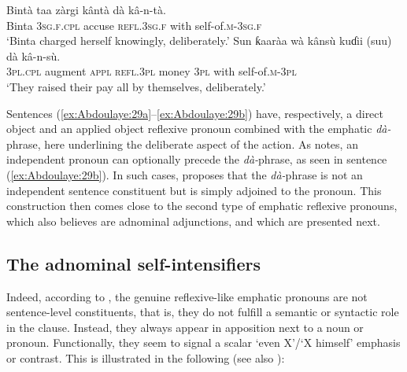 \documentclass[output=paper]{langscibook}
\begin{document}
\ea%
    \label{ex:Abdoulaye:29}
    \ea \label{ex:Abdoulaye:29a}
    \gll Bintà  taa  zàrgi  kântà  dà  kâ-n-tà.\\
    Binta  \textsc{3sg.f.cpl}  accuse  \textsc{refl.3sg.f}  with  self-of.\textsc{m-3sg.f}\\
    \glt `Binta charged herself knowingly, deliberately.’
    \ex \label{ex:Abdoulaye:29b}
    \gll Sun  ƙaaràa  wà  kânsù  kuɗii  (suu)  dà  kâ-n-sù.\\
    \textsc{3pl.cpl}  augment  \textsc{appl}  \textsc{refl.3pl}  money  \textsc{3pl}  with  self-of.\textsc{m-3pl}\\
    \glt `They raised their pay all by themselves, deliberately.’
    \z
\z

       

Sentences (\ref{ex:Abdoulaye:29a}--\ref{ex:Abdoulaye:29b}) have, respectively, a direct object and an applied object reflexive pronoun combined with the emphatic \textit{dà\nobreakdash-}phrase, here underlining the deliberate aspect of the action. As \citet[527]{Newman2000} notes, an independent pronoun can optionally precede the \textit{dà\nobreakdash-}phrase, as seen in sentence (\ref{ex:Abdoulaye:29b}). In such cases, \citeauthor{Newman2000} proposes that the \textit{dà\nobreakdash-}phrase is not an independent sentence constituent but is simply adjoined to the pronoun. This construction then comes close to the second type of emphatic reflexive pronouns, which \citeauthor{Newman2000} also believes are adnominal adjunctions, and which are presented next.


\subsection{The adnominal self-intensifiers} \label{sec:Abdoulaye:6.2}

Indeed, according to \citet{Newman2000}, the genuine reflexive-like emphatic pronouns are not sentence-level constituents, that is, they do not fulfill a semantic or syntactic role in the clause. Instead, they always appear in apposition next to a noun or pronoun. Functionally, they seem to signal a scalar ‘even X’/‘X himself’ emphasis or contrast. This is illustrated in the following (see also \citealt[527]{Newman2000}):
\end{document}

